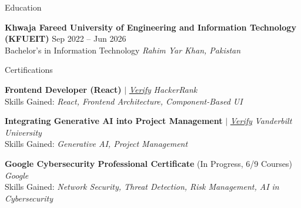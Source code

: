 \documentclass{resume} %
\begin{document}

\begin{rSection}{Education}

\textbf{Khwaja Fareed University of Engineering and Information Technology (KFUEIT)} \hfill Sep 2022 -- Jun 2026\\
Bachelor's in Information Technology \hfill \textit{Rahim Yar Khan, Pakistan}

\end{rSection}

\begin{rSection}{Certifications}

\textbf{Frontend Developer (React)} $|$ \href{https://www.hackerrank.com/certificates/1378556b2b20}{\textit{Verify}} \hfill \textit{HackerRank}\\
Skills Gained: \textit{React, Frontend Architecture, Component-Based UI}

\vspace{0.5em}
\textbf{Integrating Generative AI into Project Management} $|$ \href{https://www.coursera.org/account/accomplishments/verify/79J07YEGBFSN}{\textit{Verify}} \hfill \textit{Vanderbilt University}\\
Skills Gained: \textit{Generative AI, Project Management}

\vspace{0.5em}
\textbf{Google Cybersecurity Professional Certificate} (In Progress, 6/9 Courses) \hfill \textit{Google}\\
Skills Gained: \textit{Network Security, Threat Detection, Risk Management, AI in Cybersecurity}

\end{rSection}
\end{document}
